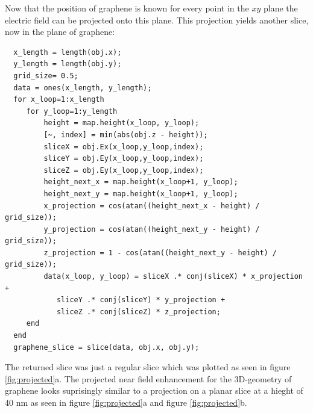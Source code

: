 Now that the position of graphene is known for every point in the $xy$ plane the electric field can be projected onto this plane. This projection yields another slice, now in the plane of graphene:

\begin{verbatim}
  x_length = length(obj.x);
  y_length = length(obj.y);
  grid_size= 0.5;
  data = ones(x_length, y_length);
  for x_loop=1:x_length
     for y_loop=1:y_length
         height = map.height(x_loop, y_loop);
         [~, index] = min(abs(obj.z - height));
         sliceX = obj.Ex(x_loop,y_loop,index);
         sliceY = obj.Ey(x_loop,y_loop,index);
         sliceZ = obj.Ey(x_loop,y_loop,index);
         height_next_x = map.height(x_loop+1, y_loop);
         height_next_y = map.height(x_loop+1, y_loop);
         x_projection = cos(atan((height_next_x - height) / grid_size));
         y_projection = cos(atan((height_next_y - height) / grid_size));
         z_projection = 1 - cos(atan((height_next_y - height) / grid_size));
         data(x_loop, y_loop) = sliceX .* conj(sliceX) * x_projection +
            sliceY .* conj(sliceY) * y_projection +
            sliceZ .* conj(sliceZ) * z_projection;
     end
  end
  graphene_slice = slice(data, obj.x, obj.y);
\end{verbatim}

The returned slice was just a regular slice which was plotted as seen in figure \ref{fig:projected}a. The projected near field enhancement for the 3D-geometry of graphene looks suprisingly similar to a projection on a planar slice at a hieght of 40 nm as seen in figure \ref{fig:projected}a and figure \ref{fig:projected}b.

